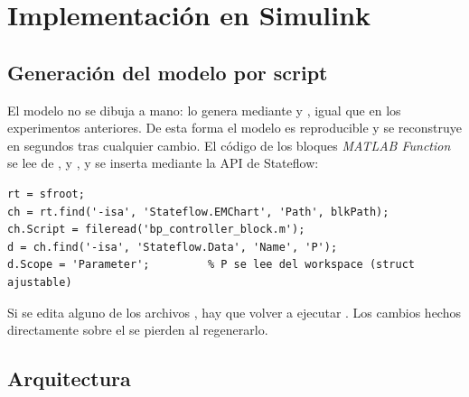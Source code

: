 \chapter{Implementación en Simulink}
\label{cap:simulink}

\section{Generación del modelo por script}

El modelo  no se dibuja a mano: lo genera  mediante  y , igual que en los experimentos anteriores. De esta forma el modelo es reproducible y se reconstruye en segundos tras cualquier cambio. El código de los bloques \emph{MATLAB Function} se lee de ,  y , y se inserta mediante la API de Stateflow:

\begin{lstlisting}[caption={Inserción del código de un bloque \emph{MATLAB Function} y declaración de \code{P} como parámetro.}]
rt = sfroot;
ch = rt.find('-isa', 'Stateflow.EMChart', 'Path', blkPath);
ch.Script = fileread('bp_controller_block.m');
d = ch.find('-isa', 'Stateflow.Data', 'Name', 'P');
d.Scope = 'Parameter';         % P se lee del workspace (struct ajustable)
\end{lstlisting}

\begin{aviso}
Si se edita alguno de los archivos , hay que volver a ejecutar . Los cambios hechos directamente sobre el  se pierden al regenerarlo.
\end{aviso}

\section{Arquitectura}

